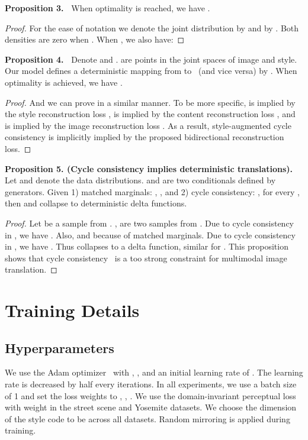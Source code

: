 \documentclass[runningheads]{llncs}
\newcommand{\oneshot}[2]{\noindent\textbf{Proposition {#1}.\ }{#2}}
\begin{document}
\oneshot{3}{
	When optimality is reached,  we have
	.
}

	\begin{proof}
		For the ease of notation we denote the joint distribution  by  and  by . Both densities are zero when . When , we also have:
		
	\end{proof}


\oneshot{4}{
	Denote  and .  are points in the joint spaces of image and style. Our model defines a deterministic mapping  from  to ~(and vice versa) by . When optimality is achieved, we have .
}

	\begin{proof}
		
		And we can prove  in a similar manner. To be more specific,  is implied by the style reconstruction loss ,  is implied by the content reconstruction loss , and  is implied by the image reconstruction loss . As a result, style-augmented cycle consistency is implicitly implied by the proposed bidirectional reconstruction loss.
	\end{proof}


\noindent \textbf{Proposition 5. (Cycle consistency implies deterministic translations).}
	Let  and  denote the data distributions.  and  are two conditionals defined by generators. Given 1) matched marginals: , , and 2) cycle consistency: ,  for every , then  and  collapse to deterministic delta functions.


\begin{proof}
		Let  be a sample from . ,  are two samples from . Due to cycle consistency in , we have . Also,  and  because of matched marginals. Due to cycle consistency in , we have . Thus  collapses to a delta function, similar for .		
		This proposition shows that cycle consistency~\cite{zhu2017unpaired} is a too strong constraint for multimodal image translation.
	\end{proof}
	
\section{Training Details}
	\label{app:hyperparameters}
	\subsection{Hyperparameters}
	We use the Adam optimizer~\cite{kingma2015adam} with , , and an initial learning rate of . The learning rate is decreased by half every  iterations. In all experiments, we use a batch size of 1 and set the loss weights to , , . We use the domain-invariant perceptual loss with weight  in the street scene and Yosemite datasets. We choose the dimension of the style code to be  across all datasets. Random mirroring is applied during training.
\end{document}
